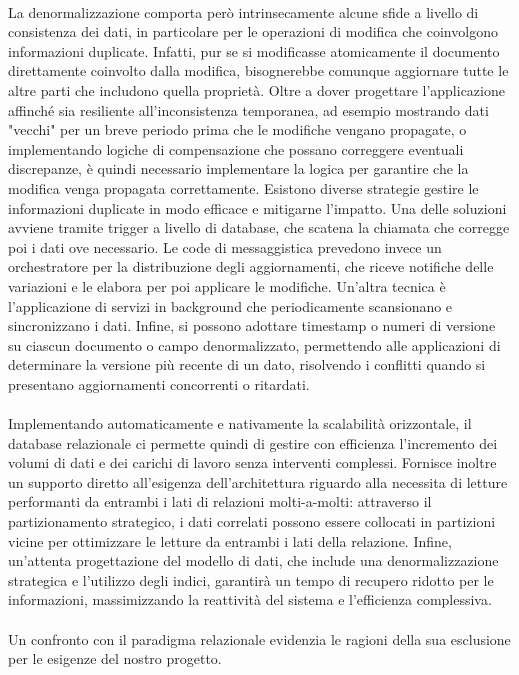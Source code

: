 \\
La denormalizzazione comporta però intrinsecamente
alcune sfide a livello di consistenza dei dati,
in particolare per le operazioni di modifica che coinvolgono informazioni duplicate.
Infatti, pur se si modificasse atomicamente il documento direttamente coinvolto dalla modifica,
bisognerebbe comunque aggiornare tutte le altre parti che includono quella proprietà.
Oltre a dover progettare l'applicazione affinché sia resiliente all'inconsistenza temporanea,
ad esempio mostrando dati "vecchi" per un breve periodo prima che le modifiche vengano propagate, 
o implementando logiche di compensazione che possano correggere eventuali discrepanze,
è quindi necessario implementare la logica per garantire che la modifica venga propagata correttamente.
Esistono diverse strategie gestire le informazioni duplicate in modo efficace e mitigarne l'impatto. 
Una delle soluzioni avviene tramite trigger a livello di database, 
che scatena la chiamata che corregge poi i dati ove necessario.
Le code di messaggistica prevedono invece un orchestratore per la distribuzione degli aggiornamenti, 
che riceve notifiche delle variazioni e le elabora per poi applicare le modifiche.
Un'altra tecnica è l'applicazione di servizi in background che periodicamente scansionano e sincronizzano i dati. 
Infine, si possono adottare timestamp o numeri di versione su ciascun documento o campo denormalizzato,
permettendo alle applicazioni di determinare la versione più recente di un dato, 
risolvendo i conflitti quando si presentano aggiornamenti concorrenti o ritardati.\\
\\
Implementando automaticamente e nativamente la scalabilità orizzontale,
il database relazionale ci permette quindi di gestire con efficienza
l'incremento dei volumi di dati e dei carichi di lavoro senza interventi complessi.
Fornisce inoltre un supporto diretto all'esigenza dell'architettura
riguardo alla necessita di letture performanti
da entrambi i lati di relazioni molti-a-molti:
attraverso il partizionamento strategico,
i dati correlati possono essere collocati in partizioni vicine
per ottimizzare le letture da entrambi i lati della relazione.
Infine, un'attenta progettazione del modello di dati,
che include una denormalizzazione strategica e l'utilizzo degli indici,
garantirà un tempo di recupero ridotto per le informazioni,
massimizzando la reattività del sistema e l'efficienza complessiva.\\
\\
Un confronto con il paradigma relazionale evidenzia le ragioni della sua esclusione per le esigenze del nostro progetto.

